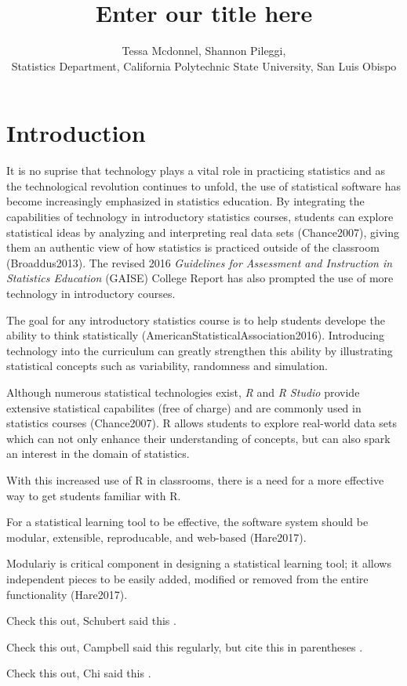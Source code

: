 \documentclass{tise_style}
\title{Enter our title here}
\author{Tessa Mcdonnel, Shannon Pileggi,  \\Statistics Department, California Polytechnic State University, San Luis Obispo}
\begin{document}
\section{Introduction}

It is no suprise that technology plays a vital role in practicing statistics and as the technological revolution continues to unfold, the use of statistical software has become increasingly emphasized in statistics education. By integrating the capabilities of technology in introductory statistics courses, students can explore statistical ideas by analyzing and interpreting real data sets (Chance2007), giving them an authentic view of how statistics is practiced outside of the classroom (Broaddus2013). The revised 2016 \textit{Guidelines for Assessment and Instruction in Statistics Education} (GAISE) College Report has also prompted the use of more technology in introductory courses.



The goal for any introductory statistics course is to help students develope the ability to think statistically (AmericanStatisticalAssociation2016). 
Introducing technology into the curriculum can greatly strengthen this ability by illustrating statistical concepts such as variability, randomness and simulation.

Although numerous statistical technologies exist, \textit{R} and \textit{R Studio} provide extensive statistical capabilites (free of charge) and are commonly used in statistics courses (Chance2007). R allows students to explore real-world data sets which can not only enhance their understanding of concepts, but can also spark an interest in the domain of statistics.


With this increased use of R in classrooms, there is a need for a more effective way to get students familiar with R.




For a statistical learning tool to be effective, the software system should be modular, extensible, reproducable, and web-based (Hare2017). 

Modulariy is critical component in designing a statistical learning tool; it allows independent pieces to be easily added, modified or removed from the entire functionality (Hare2017). 


Check this out, Schubert said this \cite{Schubert13}.


Check this out, Campbell said this \cite{Campbell02} regularly, but cite this in parentheses \citep{Campbell02}.


Check this out, Chi said this \cite{Chi81}.




\end{document}
